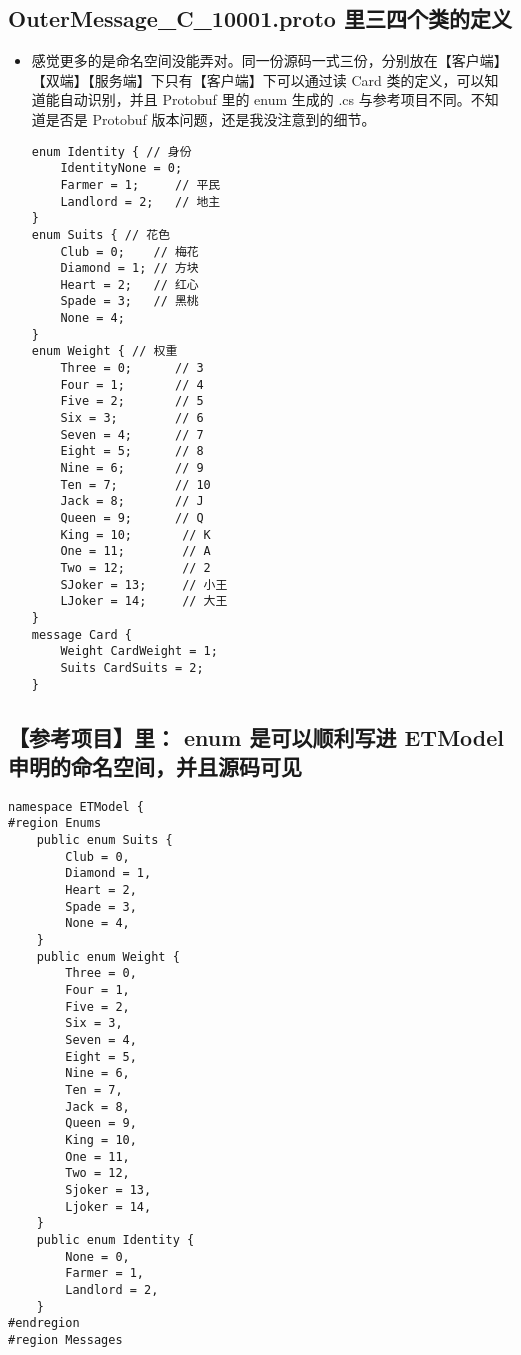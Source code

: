 \documentclass[9pt, b5paper]{article}
\begin{document}
\subsection{OuterMessage\_C\_10001.proto 里三四个类的定义}
\label{sec-2-1}
\begin{itemize}
\item 感觉更多的是命名空间没能弄对。同一份源码一式三份，分别放在【客户端】【双端】【服务端】下只有【客户端】下可以通过读 Card 类的定义，可以知道能自动识别，并且 Protobuf 里的 enum 生成的 .cs 与参考项目不同。不知道是否是 Protobuf 版本问题，还是我没注意到的细节。
\begin{verbatim}
enum Identity { // 身份
    IdentityNone = 0;
    Farmer = 1;     // 平民
    Landlord = 2;   // 地主
}
enum Suits { // 花色
    Club = 0;    // 梅花
    Diamond = 1; // 方块
    Heart = 2;   // 红心
    Spade = 3;   // 黑桃
    None = 4;
}
enum Weight { // 权重
    Three = 0;      // 3
    Four = 1;       // 4
    Five = 2;       // 5
    Six = 3;        // 6
    Seven = 4;      // 7
    Eight = 5;      // 8
    Nine = 6;       // 9
    Ten = 7;        // 10
    Jack = 8;       // J
    Queen = 9;      // Q
    King = 10;       // K
    One = 11;        // A
    Two = 12;        // 2
    SJoker = 13;     // 小王
    LJoker = 14;     // 大王
}
message Card {
    Weight CardWeight = 1;
    Suits CardSuits = 2;
}
\end{verbatim}
\end{itemize}
\subsection{【参考项目】里： enum 是可以顺利写进 ETModel 申明的命名空间，并且源码可见}
\label{sec-2-2}
\begin{verbatim}
namespace ETModel {
#region Enums
    public enum Suits {
        Club = 0,
        Diamond = 1,
        Heart = 2,
        Spade = 3,
        None = 4,
    }
    public enum Weight {
        Three = 0,
        Four = 1,
        Five = 2,
        Six = 3,
        Seven = 4,
        Eight = 5,
        Nine = 6,
        Ten = 7,
        Jack = 8,
        Queen = 9,
        King = 10,
        One = 11,
        Two = 12,
        Sjoker = 13,
        Ljoker = 14,
    }
    public enum Identity {
        None = 0,
        Farmer = 1,
        Landlord = 2,
    }
#endregion
#region Messages
\end{verbatim}
\end{document}
